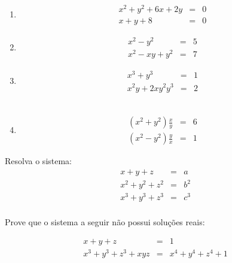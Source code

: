 \begin{questao}
\begin{enumerate}
  \item
    \begin{eqnarray*}
      x^2+y^2+6x+2y & = & 0 \\ x+y+8 & = & 0
    \end{eqnarray*}

  \item
    \begin{eqnarray*}
      x^2 -y^2 & = & 5 \\ x^2-xy+y^2 & = & 7
    \end{eqnarray*}

  \item
    \begin{eqnarray*}
      x^3+y^3 & = & 1 \\ x^2y+2xy^2y^3 & = & 2
    \end{eqnarray*}
    \
  \item
    \begin{eqnarray*}
      (x^2+y^2)\frac{x}{y} & = & 6 \\ (x^2-y^2)\frac{y}{x} & = & 1
    \end{eqnarray*}
  \end{enumerate}

\end{questao}

\begin{questao}
  Resolva o sistema:
  \begin{eqnarray*}
    x+y+z & = & a \\ x^2+y^2+z^2 & = & b^2 \\ x^3+y^3+z^3 & = & c^3 \\
  \end{eqnarray*}
\end{questao}

\begin{questao}
  Prove que o sistema a seguir não possui soluções reais:

  \begin{eqnarray*}
    x+y+z & = & 1 \\ x^3+y^3+z^3+xyz & = & x^4+y^4+z^4+1
  \end{eqnarray*}
\end{questao}

